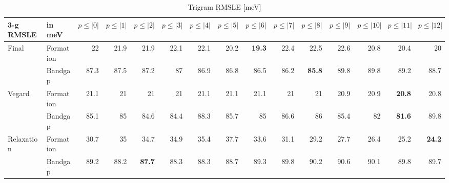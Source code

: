 \documentclass[11pt,oneside,czech,american]{book} %
\theoremstyle{definition} %
\theoremstyle{definition}
\begin{document}
\begin{table}[H]
	\scriptsize
	\centering
\begin{tabular}{llrrrrrrrrrrrrr}
	\hline
	3-g RMSLE   & in meV    &   $p{\leq}|0|$ &   $p{\leq}|1|$ &   $p{\leq}|2|$ &   $p{\leq}|3|$ &   $p{\leq}|4|$ &   $p{\leq}|5|$ &   $p{\leq}|6|$ &   $p{\leq}|7|$ &   $p{\leq}|8|$ &   $p{\leq}|9|$ &   $p{\leq}|10|$ &   $p{\leq}|11|$ &   $p{\leq}|12|$\\
	\hline
	\multirow{2}{*}{Final}       & Formation &       22   &       21.9 &       21.9 &       22.1 &       22.1 &       20.2 &       \textbf{19.3} &       22.4 &       22.5 &       22.6 &        20.8 &        20.4 &        20\\
	       & Bandgap   &       87.3 &       87.5 &       87.2 &       87   &       86.9 &       86.8 &       86.5 &       86.2 &       \textbf{85.8} &       89.8 &        89.8 &        89.2 &        88.7\\
	\multirow{2}{*}{Vegard}      & Formation &       21.1 &       21   &       21   &       21   &       21.1 &       21.1 &       21.1 &       21   &       21   &       20.9 &        20.9 &        \textbf{20.8} &        20.8\\
	     & Bandgap   &       85.1 &       85   &       84.6 &       84.4 &       88.3 &       85.7 &       85  &       86.6 &       86   &       85.4 &        82   &        \textbf{81.6} &        89.8 \\
	\multirow{2}{*}{Relaxation}  & Formation &       30.7 &       35   &       34.7 &       34.9 &       35.4 &       37.7 &       33.6 &       31.1 &       29.2 &       27.7 &        26.4 &        25.2 &        \textbf{24.2}\\
	  & Bandgap   &       89.2 &       88.2 &       \textbf{87.7} &       88.3 &       88.3 &       88.7 &       89.3 &       89.8 &       90.2 &       90.6 &        90.1 &        89.8 &        89.7\\
	\hline
\end{tabular}
	\caption{Trigram RMSLE [meV]}
	\label{3-g RMSLE}
\end{table}
\end{document}
